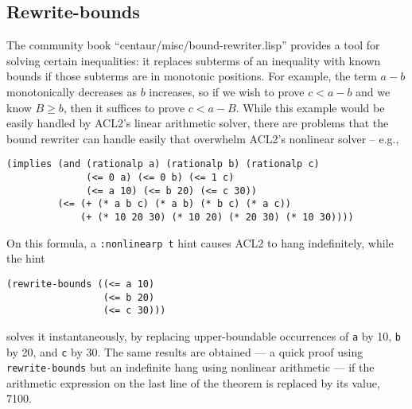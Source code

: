 \begin{comment}
  Sol, it would be interesting to know why, for the two
  clause-processors above, you used meta-extract rather than just
  making computed hints (or override hints) that :expand suitable
  terms.  I {\em do} see why computed hints wouldn't suffice if you
  were talking about metafunctions instead of clause-processors, since
  terms to be expanded can arise during rewriting.

  [Sol] One place it's used is in a hint that inducts and then
  immediately expands the calls of the given function in the induction
  conclusion but not the induction hyps.  I'm not sure how deep we
  need to go with motivation for each of these so I'm not sure if I
  should say anything about it in the paper.
\end{comment}

\subsection{Rewrite-bounds}

The community book ``centaur/misc/bound-rewriter.lisp'' provides a
tool for solving certain inequalities: it replaces subterms of an
inequality with known bounds if those subterms are in monotonic
positions.  For example, the term $a-b$ monotonically decreases as $b$
increases, so if we wish to prove $c<a-b$ and we know $B \geq b$, then
it suffices to prove $c<a-B$.  While this example would be easily
handled by ACL2's linear arithmetic solver, there are problems that
the bound rewriter can handle easily that overwhelm ACL2's nonlinear
solver -- e.g.,
\begin{verbatim}
(implies (and (rationalp a) (rationalp b) (rationalp c)
              (<= 0 a) (<= 0 b) (<= 1 c)
              (<= a 10) (<= b 20) (<= c 30))
         (<= (+ (* a b c) (* a b) (* b c) (* a c))
             (+ (* 10 20 30) (* 10 20) (* 20 30) (* 10 30))))
\end{verbatim}
On this formula, a \texttt{:nonlinearp t} hint causes ACL2 to hang indefinitely, while the hint
\begin{verbatim}
(rewrite-bounds ((<= a 10)
                 (<= b 20)
                 (<= c 30)))
\end{verbatim}
solves it instantaneously, by replacing upper-boundable occurrences of
\texttt{a} by 10, \texttt{b} by 20, and \texttt{c} by 30.  The same
results are obtained --- a quick proof using {\tt rewrite-bounds} but
an indefinite hang using nonlinear arithmetic --- if the arithmetic
expression on the last line of the theorem is replaced by its value,
7100.

